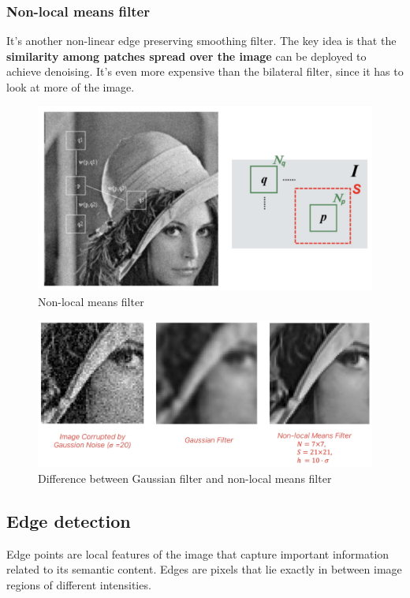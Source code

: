 \documentclass{article}
\begin{document}
\subsubsection{Non-local means filter}

It's another non-linear edge preserving smoothing filter.
The key idea is that the \textbf{similarity among patches spread over the image} can be deployed to achieve denoising.
It's even more expensive than the bilateral filter, since it has to look at more of the image.

\begin{figure}[htbp]
  \centering
  \includegraphics[width=0.7\linewidth]{./img/nonlocalmeans_filter.jpg}
  \caption{Non-local means filter}
  \label{fig:nonlocalmeans_filter}
\end{figure}

\begin{figure}[htbp]
  \centering
  \includegraphics[width=0.7\linewidth]{./img/nonlocalmeans_comparison.jpg}
  \caption{Difference between Gaussian filter and non-local means filter}
  \label{fig:nonlocalmeans_comparison}
\end{figure}

\subsection{Edge detection}

Edge points are local features of the image that capture important information related to its semantic content.
Edges are pixels that lie exactly in between image regions of different intensities.
\end{document}
